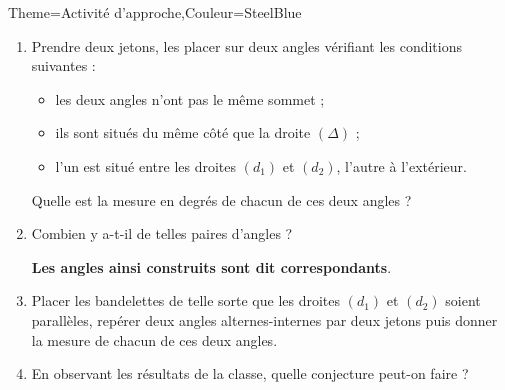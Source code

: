 \begin{Maquette}[Cours]{Theme={Activité d'approche},Couleur={SteelBlue}}
\begin{AActivite}
            \begin{enumerate}[resume]
               \item Prendre deux jetons, les placer sur deux angles vérifiant les conditions suivantes :
                  \begin{itemize}
                     \item les deux angles n'ont pas le même sommet ;
                     \item ils sont situés du même côté que la droite $(\Delta)$ ;
                     \item l'un est situé \og entre \fg{} les droites $(d_1)$ et $(d_2)$, l'autre à l'extérieur.
                  \end{itemize}
                  Quelle est la mesure en degrés de chacun de ces deux angles ? \pointilles
               \item Combien y a-t-il de telles paires d'angles ? \pointilles \par
                  {\bf Les angles ainsi construits sont dit correspondants}.
               \item Placer les bandelettes de telle sorte que les droites $(d_1)$ et $(d_2)$ soient parallèles, repérer deux angles alternes-internes par deux jetons puis donner la mesure de chacun de ces deux angles. \pointilles
               \item En observant les résultats de la classe, quelle conjecture peut-on faire ? \par
                  \pointilles
            \end{enumerate}

      \end{AActivite}

\end{Maquette}


